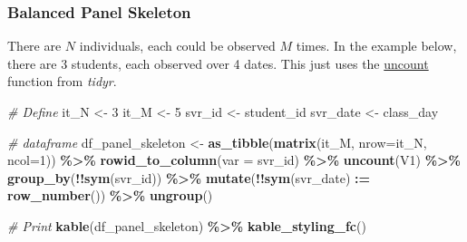 \documentclass[
]{book}
\newenvironment{Shaded}{\begin{snugshade}}{\end{snugshade}}
\newcommand{\CommentTok}[1]{\textcolor[rgb]{0.56,0.35,0.01}{\textit{#1}}}
\newcommand{\DataTypeTok}[1]{\textcolor[rgb]{0.13,0.29,0.53}{#1}}
\newcommand{\DecValTok}[1]{\textcolor[rgb]{0.00,0.00,0.81}{#1}}
\newcommand{\ErrorTok}[1]{\textcolor[rgb]{0.64,0.00,0.00}{\textbf{#1}}}
\newcommand{\KeywordTok}[1]{\textcolor[rgb]{0.13,0.29,0.53}{\textbf{#1}}}
\newcommand{\NormalTok}[1]{#1}
\newcommand{\OperatorTok}[1]{\textcolor[rgb]{0.81,0.36,0.00}{\textbf{#1}}}
\newcommand{\StringTok}[1]{\textcolor[rgb]{0.31,0.60,0.02}{#1}}
\begin{document}
\hypertarget{balanced-panel-skeleton}{%
\subsubsection{Balanced Panel Skeleton}\label{balanced-panel-skeleton}}

There are \(N\) individuals, each could be observed \(M\) times. In the example below, there are 3 students, each observed over 4 dates. This just uses the \href{https://tidyr.tidyverse.org/reference/uncount.html}{uncount} function from \emph{tidyr}.

\begin{Shaded}
\begin{Highlighting}[]
\CommentTok{\# Define}
\NormalTok{it\_N \textless{}{-}}\StringTok{ }\DecValTok{3}
\NormalTok{it\_M \textless{}{-}}\StringTok{ }\DecValTok{5}
\NormalTok{svr\_id \textless{}{-}}\StringTok{ \textquotesingle{}student\_id\textquotesingle{}}
\NormalTok{svr\_date \textless{}{-}}\StringTok{ \textquotesingle{}class\_day\textquotesingle{}}

\CommentTok{\# dataframe}
\NormalTok{df\_panel\_skeleton \textless{}{-}}\StringTok{ }\KeywordTok{as\_tibble}\NormalTok{(}\KeywordTok{matrix}\NormalTok{(it\_M, }\DataTypeTok{nrow=}\NormalTok{it\_N, }\DataTypeTok{ncol=}\DecValTok{1}\NormalTok{)) }\OperatorTok{\%\textgreater{}\%}
\StringTok{  }\KeywordTok{rowid\_to\_column}\NormalTok{(}\DataTypeTok{var =}\NormalTok{ svr\_id) }\OperatorTok{\%\textgreater{}\%}
\StringTok{  }\KeywordTok{uncount}\NormalTok{(V1) }\OperatorTok{\%\textgreater{}\%}
\StringTok{  }\KeywordTok{group\_by}\NormalTok{(}\OperatorTok{!!}\KeywordTok{sym}\NormalTok{(svr\_id)) }\OperatorTok{\%\textgreater{}\%}\StringTok{ }\KeywordTok{mutate}\NormalTok{(}\OperatorTok{!!}\KeywordTok{sym}\NormalTok{(svr\_date) }\OperatorTok{:}\ErrorTok{=}\StringTok{ }\KeywordTok{row\_number}\NormalTok{()) }\OperatorTok{\%\textgreater{}\%}
\StringTok{  }\KeywordTok{ungroup}\NormalTok{()}

\CommentTok{\# Print}
\KeywordTok{kable}\NormalTok{(df\_panel\_skeleton) }\OperatorTok{\%\textgreater{}\%}
\StringTok{  }\KeywordTok{kable\_styling\_fc}\NormalTok{()}
\end{Highlighting}
\end{Shaded}
\end{document}
